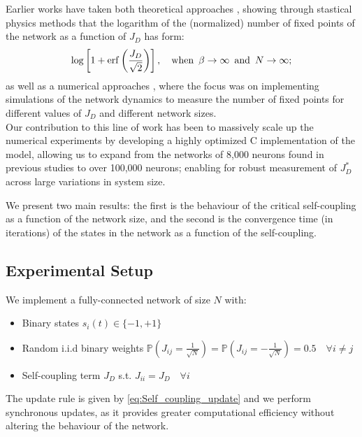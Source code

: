 \documentclass[a4paper,12pt]{report}
\begin{document}
Earlier works have taken both theoretical approaches \cite{Scardecchia2023}, showing 
through stastical physics methods that the logarithm of the (normalized) number of 
fixed points of the network as a function of $J_D$ has form:
\begin{equation}
  \log\left[ 1 + \operatorname{erf}\left( \frac{J_D}{\sqrt{2}} \right) \right],
  \quad \text{when}  \hspace{0.5em} \beta \to \infty  \hspace{0.5em} \text{and}  
  \hspace{0.5em} N \to \infty; 
\end{equation}
as well as a numerical approaches \cite{Student2024}, where the focus was on 
implementing simulations of the network dynamics to measure the number of fixed 
points for different values of $J_D$ and different network sizes. \\
Our contribution to this line of work has been to massively scale up the numerical 
experiments by developing a highly optimized C implementation of the model, allowing us
to expand from the networks of 8,000 neurons found in previous studies to over 100,000 
neurons; enabling for robust measurement of \(J_D^*\) across large variations in system 
size.

We present two main results: the first is the behaviour of the critical self-coupling
as a function of the network size, and the second is the convergence time
(in iterations) of the states in the network as a function of the self-coupling.

\subsection*{Experimental Setup}
We implement a fully-connected network of size \(N\) with:
\begin{itemize}
  \item Binary states \(s_i(t) \in \{-1,+1\}\)
  \item Random i.i.d binary weights 
  $\mathbb{P} \left(J_{ij} = \frac{1}{\sqrt{N}} \right) = \mathbb{P} \left(J_{ij} = -
  \frac{1}{\sqrt{N}} \right) = 0.5 
  \hspace{1em} \forall i \neq j$
  \item Self-coupling term $J_D$ s.t. $J_{ii} = J_D \hspace{1em} \forall i$
\end{itemize}
The update rule is given by \eqref{eq:Self_coupling_update} and we perform synchronous 
updates, as it provides greater computational efficiency without altering the behaviour 
of the network.
\end{document}
